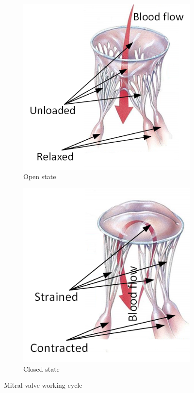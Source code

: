 \begin{figure}[H]\label{fig:workingMT}      
  \centering
  \begin{subfigure}[b]{0.3\textwidth}\label{fig:openMT}
  \includegraphics[width=\textwidth]{./fig/openMT.png}
  \caption{Open state}      
  \end{subfigure}
  \begin{subfigure}[b]{0.3\textwidth}\label{fig:closedMT}  
    \includegraphics[width=\textwidth]{./fig/closedMT.png}
      \caption{Closed state}    
  \end{subfigure}
  \caption{Mitral valve working cycle}
\end{figure} 
